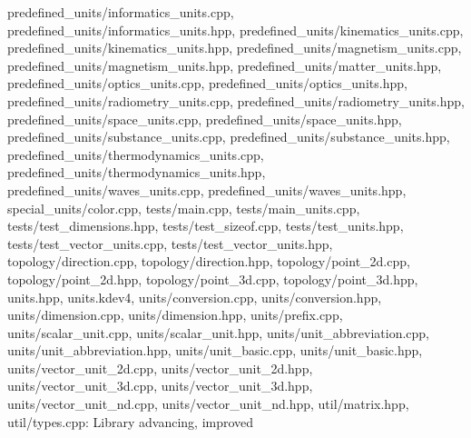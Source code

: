 \begin{DoxyVerb}
predefined_units/informatics_units.cpp,
predefined_units/informatics_units.hpp,
predefined_units/kinematics_units.cpp,
predefined_units/kinematics_units.hpp,
predefined_units/magnetism_units.cpp,
predefined_units/magnetism_units.hpp,
predefined_units/matter_units.hpp,
predefined_units/optics_units.cpp,
predefined_units/optics_units.hpp,
predefined_units/radiometry_units.cpp,
predefined_units/radiometry_units.hpp,
predefined_units/space_units.cpp, predefined_units/space_units.hpp,
predefined_units/substance_units.cpp,
predefined_units/substance_units.hpp,
predefined_units/thermodynamics_units.cpp,
predefined_units/thermodynamics_units.hpp,
predefined_units/waves_units.cpp, predefined_units/waves_units.hpp,
special_units/color.cpp, tests/main.cpp, tests/main_units.cpp,
tests/test_dimensions.hpp, tests/test_sizeof.cpp,
tests/test_units.hpp, tests/test_vector_units.cpp,
tests/test_vector_units.hpp, topology/direction.cpp,
topology/direction.hpp, topology/point_2d.cpp,
topology/point_2d.hpp, topology/point_3d.cpp,
topology/point_3d.hpp, units.hpp, units.kdev4,
units/conversion.cpp, units/conversion.hpp, units/dimension.cpp,
units/dimension.hpp, units/prefix.cpp, units/scalar_unit.cpp,
units/scalar_unit.hpp, units/unit_abbreviation.cpp,
units/unit_abbreviation.hpp, units/unit_basic.cpp,
units/unit_basic.hpp, units/vector_unit_2d.cpp,
units/vector_unit_2d.hpp, units/vector_unit_3d.cpp,
units/vector_unit_3d.hpp, units/vector_unit_nd.cpp,
units/vector_unit_nd.hpp, util/matrix.hpp, util/types.cpp: Library
advancing, improved
\end{DoxyVerb}
